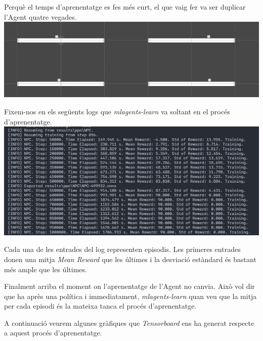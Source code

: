\documentclass{article}
\begin{document}
    Perquè el temps d'aprenentatge es fes més curt, el que vaig fer va ser duplicar l'Agent quatre vegades. \\
        
    \includegraphics[width=\textwidth]{images/v1/autonomia_v1.jpeg}
    
    Fixem-nos en els següents logs que \textit{mlagents-learn} va soltant en el procés d'aprenentatge. \\
    
    \includegraphics[width=\textwidth]{images/v1/log_v1.jpeg}
    
    Cada una de les entrades del log representen episodis. Les primeres entrades donen una mitja \textit{Mean Reward} que les últimes i la desviació estàndard és bastant més ample que les últimes.
    
    Finalment arriba el moment on l'aprenentatge de l'Agent no canvia. Això vol dir que ha après una política i immediatament, \textit{mlagents-learn} quan veu que la mitja per cada episodi és la mateixa tanca el procés d'aprenentatge.
    

    A continuació veurem algunes gràfiques que \textit{Tensorboard} ens ha generat respecte a aquest procés d'aprenentatge.
    
\end{document}
